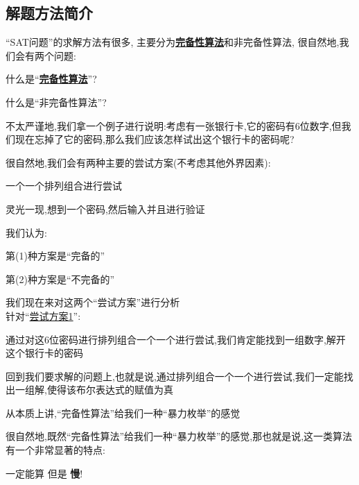     \subsection{解题方法简介}
        ``SAT问题''的求解方法有很多,
        主要分为\underline{\textbf{完备性算法}}和非完备性算法,
        很自然地,我们会有两个问题:\\
        \begin{center}
            什么是``\underline{\textbf{完备性算法}}''?
        \end{center}
        \begin{center}
            什么是``非完备性算法''?
        \end{center}
        \par
        不太严谨地,我们拿一个例子进行说明:考虑有一张银行卡,它的密码有6位数字,但我们现在忘掉了它的密码,那么我们应该怎样试出这个银行卡的密码呢?\par
        很自然地,我们会有两种主要的尝试方案(不考虑其他外界因素):\\
        \begin{center}
            一个一个排列组合进行尝试
        \end{center}    
        \begin{center}
            灵光一现,想到一个密码,然后输入并且进行验证
        \end{center}
        \par
        我们认为:
        \begin{center}
            第(1)种方案是``完备的''
        \end{center}
        \begin{center}
            第(2)种方案是``不完备的''
        \end{center}
        \par
        我们现在来对这两个``尝试方案''进行分析\\
        针对``\underline{尝试方案1}'':\par
            通过对这6位密码进行排列组合一个一个进行尝试,我们肯定能找到一组数字,解开这个银行卡的密码\par
            回到我们要求解的问题上,也就是说,通过排列组合一个一个进行尝试,我们一定能找出一组解,使得该布尔表达式的赋值为真\par
            从本质上讲,``完备性算法''给我们一种``暴力枚举''的感觉\par
            很自然地,既然``完备性算法''给我们一种``暴力枚举''的感觉,那也就是说,这一类算法有一个非常显著的特点:\\
        \begin{center}
            一定能算 \quad 但是 \quad \textbf{慢}!
        \end{center}
